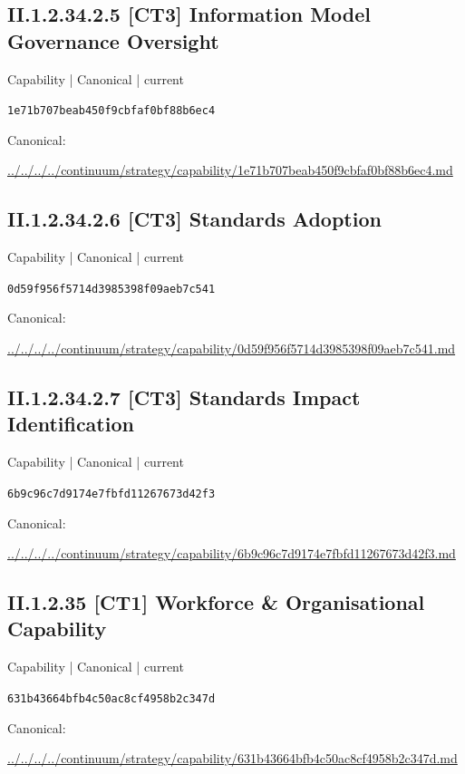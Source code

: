 \documentclass[10pt,a4paper]{article}
\begin{document}
\subsection*{II.1.2.34.2.5 [CT3] Information Model Governance Oversight}
{\small Capability | Canonical | current}\par
\texttt{1e71b707beab450f9cbfaf0bf88b6ec4}\par
Canonical: \par
{\footnotesize\url{../../../../continuum/strategy/capability/1e71b707beab450f9cbfaf0bf88b6ec4.md}}\par
\subsection*{II.1.2.34.2.6 [CT3] Standards Adoption}
{\small Capability | Canonical | current}\par
\texttt{0d59f956f5714d3985398f09aeb7c541}\par
Canonical: \par
{\footnotesize\url{../../../../continuum/strategy/capability/0d59f956f5714d3985398f09aeb7c541.md}}\par
\subsection*{II.1.2.34.2.7 [CT3] Standards Impact Identification}
{\small Capability | Canonical | current}\par
\texttt{6b9c96c7d9174e7fbfd11267673d42f3}\par
Canonical: \par
{\footnotesize\url{../../../../continuum/strategy/capability/6b9c96c7d9174e7fbfd11267673d42f3.md}}\par
\subsection*{II.1.2.35 [CT1] Workforce \& Organisational Capability}
{\small Capability | Canonical | current}\par
\texttt{631b43664bfb4c50ac8cf4958b2c347d}\par
Canonical: \par
{\footnotesize\url{../../../../continuum/strategy/capability/631b43664bfb4c50ac8cf4958b2c347d.md}}\par
\end{document}
